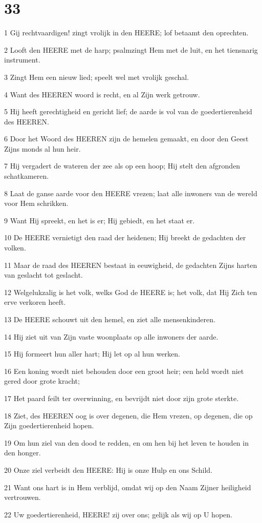 \chapter{33}

\par 1 Gij rechtvaardigen! zingt vrolijk in den HEERE; lof betaamt den oprechten.
\par 2 Looft den HEERE met de harp; psalmzingt Hem met de luit, en het tiensnarig instrument.
\par 3 Zingt Hem een nieuw lied; speelt wel met vrolijk geschal.
\par 4 Want des HEEREN woord is recht, en al Zijn werk getrouw.
\par 5 Hij heeft gerechtigheid en gericht lief; de aarde is vol van de goedertierenheid des HEEREN.
\par 6 Door het Woord des HEEREN zijn de hemelen gemaakt, en door den Geest Zijns monds al hun heir.
\par 7 Hij vergadert de wateren der zee als op een hoop; Hij stelt den afgronden schatkameren.
\par 8 Laat de ganse aarde voor den HEERE vrezen; laat alle inwoners van de wereld voor Hem schrikken.
\par 9 Want Hij spreekt, en het is er; Hij gebiedt, en het staat er.
\par 10 De HEERE vernietigt den raad der heidenen; Hij breekt de gedachten der volken.
\par 11 Maar de raad des HEEREN bestaat in eeuwigheid, de gedachten Zijns harten van geslacht tot geslacht.
\par 12 Welgelukzalig is het volk, welks God de HEERE is; het volk, dat Hij Zich ten erve verkoren heeft.
\par 13 De HEERE schouwt uit den hemel, en ziet alle mensenkinderen.
\par 14 Hij ziet uit van Zijn vaste woonplaats op alle inwoners der aarde.
\par 15 Hij formeert hun aller hart; Hij let op al hun werken.
\par 16 Een koning wordt niet behouden door een groot heir; een held wordt niet gered door grote kracht;
\par 17 Het paard feilt ter overwinning, en bevrijdt niet door zijn grote sterkte.
\par 18 Ziet, des HEEREN oog is over degenen, die Hem vrezen, op degenen, die op Zijn goedertierenheid hopen.
\par 19 Om hun ziel van den dood te redden, en om hen bij het leven te houden in den honger.
\par 20 Onze ziel verbeidt den HEERE: Hij is onze Hulp en ons Schild.
\par 21 Want ons hart is in Hem verblijd, omdat wij op den Naam Zijner heiligheid vertrouwen.
\par 22 Uw goedertierenheid, HEERE! zij over ons; gelijk als wij op U hopen.

